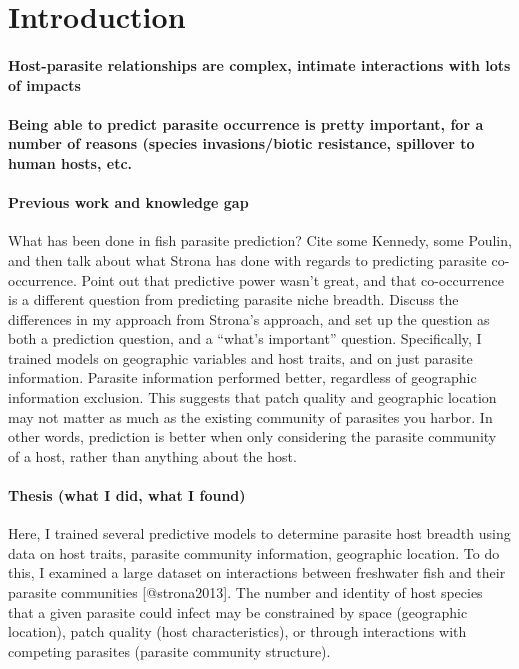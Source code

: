 \documentclass[12pt]{article}
\begin{document}
\section{Introduction}
 \paragraph{Host-parasite relationships are complex, intimate interactions with lots of impacts}
 
 
 
 
 \paragraph{Being able to predict parasite occurrence is pretty important, for a number of reasons (species invasions/biotic resistance, spillover to human hosts, etc.}
 
 
 
 \paragraph{Previous work and knowledge gap}
  
  What has been done in fish parasite prediction? Cite some Kennedy, some Poulin, and then talk about what Strona has done with regards to predicting parasite co-occurrence. Point out that predictive power wasn't great, and that co-occurrence is a different question from predicting parasite niche breadth. Discuss the differences in my approach from Strona's approach, and set up the question as both a prediction question, and a ``what's important'' question. Specifically, I trained models on geographic variables and host traits, and on just parasite information. Parasite information performed better, regardless of geographic information exclusion. This suggests that patch quality and geographic location may not matter as much as the existing community of parasites you harbor. In other words, prediction is better when only considering the parasite community of a host, rather than anything about the host. 


 \paragraph{Thesis (what I did, what I found)}
 Here, I trained several predictive models to determine parasite host breadth using data on host traits, parasite community information, geographic location. To do this, I examined a large dataset on interactions between freshwater fish and their parasite communities [@strona2013]. The number and identity of host species that a given parasite could infect may be constrained by space (geographic location), patch quality (host characteristics), or through interactions with competing parasites (parasite community structure). 
 
\end{document}
